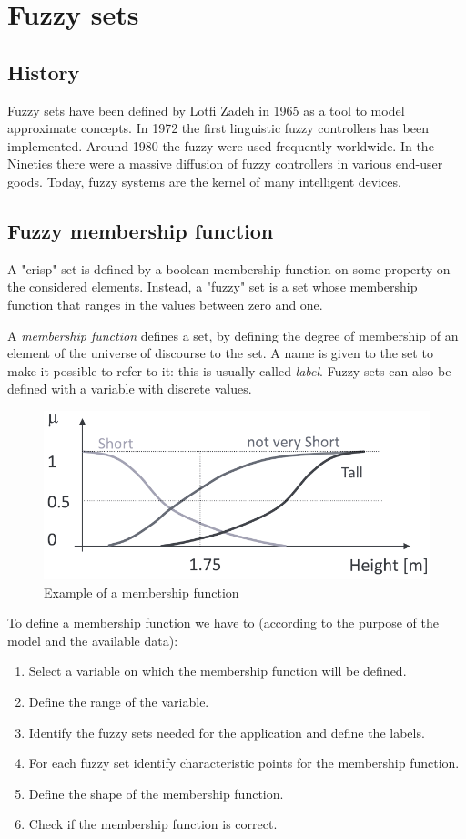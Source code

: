 \documentclass[12pt, a4paper]{report}
\begin{document}
    \newpage

    \chapter{Fuzzy sets}
    \section{History}
    Fuzzy sets have been defined by Lotfi Zadeh in 1965 as a tool to model approximate concepts. In 1972 the first linguistic fuzzy
    controllers has been implemented. Around 1980 the fuzzy were used frequently worldwide. In the Nineties there were a massive 
    diffusion of fuzzy controllers in various end-user goods. Today, fuzzy systems are the kernel of many intelligent devices. 

    \section{Fuzzy membership function}
    A "crisp" set is defined by a boolean membership function on some property on the considered elements. Instead, a "fuzzy" set is
    a set whose membership function that ranges in the values between zero and one.
    \begin{definition}
        A \emph{membership function} defines a set, by defining the degree of membership of an element of the universe of discourse 
        to the set. A name is given to the set to make it possible to refer to it: this is usually called \emph{label}. Fuzzy sets can 
        also be defined with a variable with discrete values. 
    \end{definition}
    \begin{figure}[H]
        \centering
        \includegraphics[width=0.50\linewidth]{images/function.png}
        \caption{Example of a membership function}
    \end{figure}
    To define a membership function we have to (according to the purpose of the model and the available data):
    \begin{enumerate}
        \item Select a variable on which the membership function will be defined. 
        \item Define the range of the variable.
        \item Identify the fuzzy sets needed for the application and define the labels. 
        \item For each fuzzy set identify characteristic points for the membership function.
        \item Define the shape of the membership function.
        \item Check if the membership function is correct.
    \end{enumerate}
\end{document}
